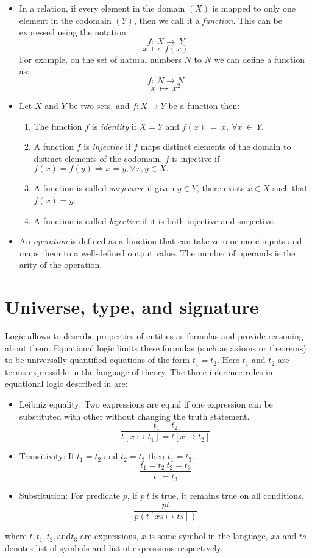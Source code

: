 \begin{itemize}
\item In a relation, if every element in the domain $(X)$ is mapped to only one
element in the codomain $(Y)$, then we call it a \emph{function}. This can be
expressed using the notation:
\[f:\ X \rightarrow\ Y\]
\[x \ \mapsto\ f(x)\]
For example, on the set of natural numbers $N$ to $N$ we can define a function as:
\[f:\ N \rightarrow N\]
\[x \ \mapsto\ x^{2}\]   
\item Let $ X $ and $ Y $ be two sets, and $ f:X \rightarrow Y$ be a function then:
\begin{enumerate}
    \item The function $f$ is \textit{identity} if $X=Y$ and $f(x)\ =\ x,\
    \forall x\ \in \ Y$.
    \item A function $f$ is \emph{injective} if $f$ maps distinct elements of
    the domain to distinct elements of the codomain. $f$ is injective if
    $f(x)=f(y) \Rightarrow x = y, \forall x,y \in X.$
    \item A function is called \emph{surjective} if given $y \in Y$, there
    exists $x\in X$ such that $f(x) = y$.
    \item A function is called \emph{bijective} if it is both injective and
    surjective.
\end{enumerate}
\item An \emph{operation} is defined as a function that can take zero or more inputs
and maps them to a well-defined output value. The number of operands is the arity
of the operation.
\end{itemize}

\section{Universe, type, and signature}
Logic allows to describe properties of entities as formulas and provide
reasoning about them. Equational logic limits these formulas (such as axioms or
theorems) to  be universally quantified equations of the form $t_1 = t_2$. Here
$t_1$ and $t_2$ are terms expressible in the language of theory. The three
inference rules in equational logic described in \cite{gries2013logical} are:
\begin{itemize}
    \item Leibniz equality: Two expressions are equal if one expression can be
    substituted with other without changing the truth statement. \[\frac{t_1
    = t_2}{t[x \mapsto t_1] = t[x \mapsto t_2]}\]
    \item Transitivity: If $t_1 = t_2$ and $t_2 = t_3$ then $t_1 = t_3$.
    \[{\frac{t_1 = t_2\ t_2 = t_3}{t_1 = t_3}}\]
    \item Substitution: For predicate $p$, if $p\ t$ is true, it remains true on all
    conditions. \[\frac{p t}{p(t[xs \mapsto ts])}\]
\end{itemize}
where $t,t_1,t_2, \text{and} t_3$ are expressions, $x$ is some symbol in the
language, $xs$ and $ts$ denotes list of symbols and list of expressions
respectively. 

